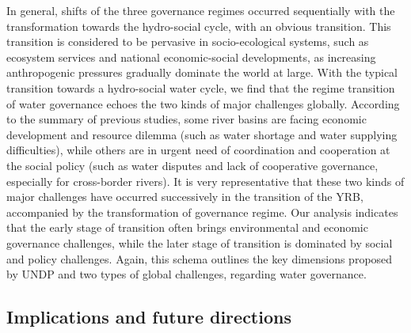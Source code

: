 \documentclass[9pt, twocolumn, twoside, lineno]{pnas-new}
\begin{document}
In general, shifts of the three governance regimes occurred sequentially with the transformation towards the hydro-social cycle, with an obvious transition.
This transition is considered to be pervasive in socio-ecological systems, such as ecosystem services and national economic-social developments, as increasing anthropogenic pressures gradually dominate the world at large.
With the typical transition towards a hydro-social water cycle, we find that the regime transition of water governance echoes the two kinds of major challenges globally.
According to the summary of previous studies, some river basins are facing economic development and resource dilemma (such as water shortage and water supplying difficulties), while others are in urgent need of coordination and cooperation at the social policy (such as water disputes and lack of cooperative governance, especially for cross-border rivers).
It is very representative that these two kinds of major challenges have occurred successively in the transition of the YRB, accompanied by the transformation of governance regime.
Our analysis indicates that the early stage of transition often brings environmental and economic governance challenges, while the later stage of transition is dominated by social and policy challenges.
Again, this schema outlines the key dimensions proposed by UNDP and two types of global challenges, regarding water governance. 


\subsection*{Implications and future directions}
\label{Outlook}
\end{document}
